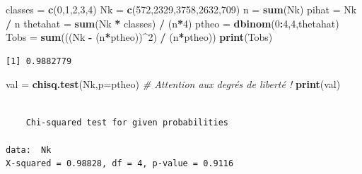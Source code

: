 \documentclass[
]{book}
\newenvironment{Shaded}{\begin{snugshade}}{\end{snugshade}}
\newcommand{\CommentTok}[1]{\textcolor[rgb]{0.56,0.35,0.01}{\textit{#1}}}
\newcommand{\DataTypeTok}[1]{\textcolor[rgb]{0.13,0.29,0.53}{#1}}
\newcommand{\DecValTok}[1]{\textcolor[rgb]{0.00,0.00,0.81}{#1}}
\newcommand{\KeywordTok}[1]{\textcolor[rgb]{0.13,0.29,0.53}{\textbf{#1}}}
\newcommand{\NormalTok}[1]{#1}
\newcommand{\OperatorTok}[1]{\textcolor[rgb]{0.81,0.36,0.00}{\textbf{#1}}}
\newcommand{\StringTok}[1]{\textcolor[rgb]{0.31,0.60,0.02}{#1}}
\theoremstyle{definition}
\theoremstyle{definition}
\theoremstyle{definition}
\theoremstyle{definition}
\theoremstyle{remark}
\begin{document}
\begin{Shaded}
\begin{Highlighting}[]
\NormalTok{classes =}\StringTok{ }\KeywordTok{c}\NormalTok{(}\DecValTok{0}\NormalTok{,}\DecValTok{1}\NormalTok{,}\DecValTok{2}\NormalTok{,}\DecValTok{3}\NormalTok{,}\DecValTok{4}\NormalTok{)}
\NormalTok{Nk =}\StringTok{ }\KeywordTok{c}\NormalTok{(}\DecValTok{572}\NormalTok{,}\DecValTok{2329}\NormalTok{,}\DecValTok{3758}\NormalTok{,}\DecValTok{2632}\NormalTok{,}\DecValTok{709}\NormalTok{)}
\NormalTok{n =}\StringTok{ }\KeywordTok{sum}\NormalTok{(Nk)}
\NormalTok{pihat =}\StringTok{ }\NormalTok{Nk }\OperatorTok{/}\StringTok{ }\NormalTok{n}
\NormalTok{thetahat =}\StringTok{ }\KeywordTok{sum}\NormalTok{(Nk }\OperatorTok{*}\StringTok{ }\NormalTok{classes) }\OperatorTok{/}\StringTok{ }\NormalTok{(n}\OperatorTok{*}\DecValTok{4}\NormalTok{)}
\NormalTok{ptheo =}\StringTok{ }\KeywordTok{dbinom}\NormalTok{(}\DecValTok{0}\OperatorTok{:}\DecValTok{4}\NormalTok{,}\DecValTok{4}\NormalTok{,thetahat)}
\NormalTok{Tobs =}\StringTok{ }\KeywordTok{sum}\NormalTok{(((Nk }\OperatorTok{-}\StringTok{ }\NormalTok{(n}\OperatorTok{*}\NormalTok{ptheo))}\OperatorTok{^}\DecValTok{2}\NormalTok{) }\OperatorTok{/}\StringTok{ }\NormalTok{(n}\OperatorTok{*}\NormalTok{ptheo)) }
\KeywordTok{print}\NormalTok{(Tobs)}
\end{Highlighting}
\end{Shaded}

\begin{verbatim}
[1] 0.9882779
\end{verbatim}

\begin{Shaded}
\begin{Highlighting}[]
\NormalTok{val =}\StringTok{ }\KeywordTok{chisq.test}\NormalTok{(Nk,}\DataTypeTok{p=}\NormalTok{ptheo)  }\CommentTok{# Attention aux degrés de liberté ! }
\KeywordTok{print}\NormalTok{(val)}
\end{Highlighting}
\end{Shaded}

\begin{verbatim}

    Chi-squared test for given probabilities

data:  Nk
X-squared = 0.98828, df = 4, p-value = 0.9116
\end{verbatim}

\begin{Shaded}
\end{Shaded}
\end{document}
